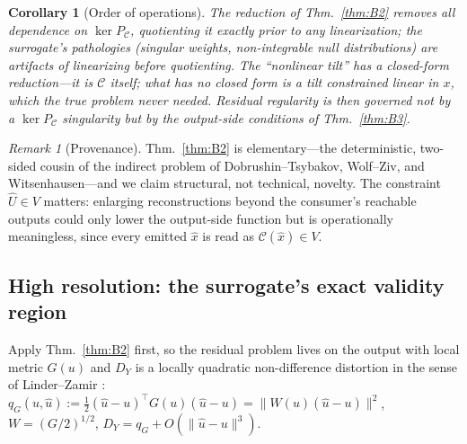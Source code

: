 \documentclass[lettersize,onecolumn]{IEEEtran}
\newtheorem{corollary}{Corollary}
\theoremstyle{definition}
\theoremstyle{remark}
\newtheorem*{remark}{Remark}
\newcommand{\PC}{P_{\mathcal{C}}}
\begin{document}
\begin{corollary}[Order of operations]\label{cor:B2b}
The reduction of Thm.~\ref{thm:B2} removes all dependence on $\ker\PC$, quotienting it
\emph{exactly} prior to any linearization; the surrogate's pathologies (singular
weights, non-integrable null distributions) are artifacts of linearizing before
quotienting. The ``nonlinear tilt'' has a closed-form \emph{reduction}---it is
$\mathcal{C}$ itself; what has no closed form is a tilt constrained linear in $x$,
which the true problem never needed. Residual regularity is then governed not by a
$\ker\PC$ singularity but by the output-side conditions of Thm.~\ref{thm:B3}.
\end{corollary}

\begin{remark}[Provenance]
Thm.~\ref{thm:B2} is elementary---the deterministic, two-sided cousin of the indirect
problem of Dobrushin--Tsybakov, Wolf--Ziv, and Witsenhausen---and we claim structural,
not technical, novelty. The constraint $\hat U\in V$ matters: enlarging reconstructions
beyond the consumer's reachable outputs could only lower the output-side function but
is operationally meaningless, since every emitted $\hat x$ is read as
$\mathcal{C}(\hat x)\in V$.
\end{remark}

\subsection{High resolution: the surrogate's exact validity region}

Apply Thm.~\ref{thm:B2} first, so the residual problem lives on the output with local
metric $G(u)$ and $D_Y$ is a locally quadratic non-difference distortion in the sense
of Linder--Zamir \cite{linderzamir1999}: $q_G(u,\hat u):=\tfrac12(\hat u-u)^\top
G(u)(\hat u-u)=\|W(u)(\hat u-u)\|^2$, $W=(G/2)^{1/2}$, $D_Y=q_G+O(\|\hat u-u\|^3)$.
\end{document}
